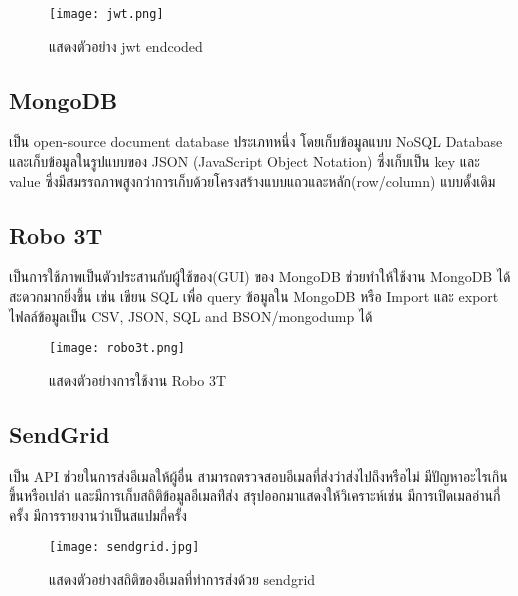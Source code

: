 \begin{figure}[H]
  \centering
  \texttt{[image: jwt.png]}
  \caption{แสดงตัวอย่าง jwt endcoded}
  \label{Fig:jwt}
\end{figure}

\subsection{MongoDB}

เป็น open-source document database ประเภทหนึ่ง โดยเก็บข้อมูลแบบ NoSQL Database และเก็บข้อมูลในรูปแบบของ JSON (JavaScript Object Notation) ซึ่งเก็บเป็น key และ value ซึ่งมีสมรรถภาพสูงกว่าการเก็บด้วยโครงสร้างแบบแถวและหลัก(row/column) แบบดั้งเดิม~\cite{mongodb}

\subsection{Robo 3T}

เป็นการใช้ภาพเป็นตัวประสานกับผู้ใช้ของ(GUI) ของ MongoDB ช่วยทำให้ใช้งาน MongoDB ได้สะดวกมากยิ่งขึ้น เช่น เขียน SQL เพื่อ query ข้อมูลใน MongoDB หรือ Import และ export ไฟลล์ข้อมูลเป็น CSV, JSON, SQL and BSON/mongodump ได้~\cite{robo3t}

\begin{figure}[H]
  \centering
  \texttt{[image: robo3t.png]}
  \caption{แสดงตัวอย่างการใช้งาน Robo 3T}
  \label{Fig:robo3t}
\end{figure}

\subsection{SendGrid}

เป็น API ช่วยในการส่งอีเมลให้ผู้อื่น สามารถตรวจสอบอีเมลที่ส่งว่าส่งไปถึงหรือไม่ มีปัญหาอะไรเกินขึ้นหรือเปล่า และมีการเก็บสถิติข้อมูลอีเมลท่ีส่ง สรุปออกมาแสดงให้วิเคราะห์เช่น มีการเปิดเมลอ่านกี่ครั้ง มีการรายงานว่าเป็นสแปมกี่ครั้ง

\begin{figure}[H]
  \centering
  \texttt{[image: sendgrid.jpg]}
  \caption{แสดงตัวอย่างสถิติของอีเมลที่ทำการส่งด้วย sendgrid}
  \label{Fig:robo3t}
\end{figure}

